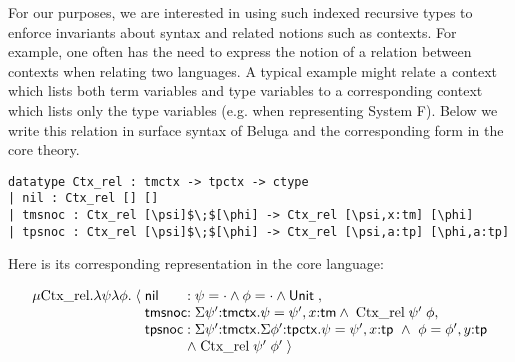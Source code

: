 \documentclass{article}
\begin{document}
For our purposes, we are interested in using such indexed recursive
types to enforce invariants about syntax and related notions such as contexts.
For example, one often has the need to express the notion of a relation
between contexts when relating two languages. A typical example might relate a context
which lists both term variables and type variables to a corresponding
context which lists only the type variables (e.g. when representing
System F). Below we write this relation in surface syntax of Beluga and the
corresponding form in the core theory. 


\begin{lstlisting}
datatype Ctx_rel : tmctx -> tpctx -> ctype
| nil : Ctx_rel [] []
| tmsnoc : Ctx_rel [\psi]$\;$[\phi] -> Ctx_rel [\psi,x:tm] [\phi]
| tpsnoc : Ctx_rel [\psi]$\;$[\phi] -> Ctx_rel [\psi,a:tp] [\phi,a:tp]
\end{lstlisting}


Here is its corresponding representation in the core language: 

\[
\begin{array}{r@{\;}c@{\;}l@{}l}
\mu \text{Ctx\_rel}. \lambda \psi\lambda \phi. & \langle & \m{nil}\; &:  \psi
= \cdot \andalso \phi = \cdot \andalso \tunit\;, \\
&  & \m{tmsnoc} & : \Sigma \psi'{:}{\m{tmctx}}. \psi = \psi', x{:}\m{tm}
\andalso\;\text{Ctx\_rel}\;\psi'\;\phi ,\\
&  & \m{tpsnoc} & : \Sigma \psi'{:}{\m{tmctx}}. \Sigma
\phi'{:}{\m{tpctx}}. \psi = \psi', x{:}\m{tp} ~\andalso~ \phi = \phi',
y{:}\m{tp} \\
&&& \andalso\;\text{Ctx\_rel}\;\psi'\;\phi' \;\rangle 
\end{array}
\]
\end{document}

